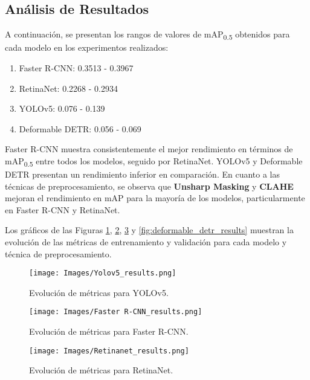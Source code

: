 \subsection{Análisis de Resultados}

A continuación, se presentan los rangos de valores de mAP\textsubscript{0.5} obtenidos para cada modelo en los experimentos realizados:

\begin{enumerate}
    \item Faster R-CNN: 0.3513 - 0.3967
    \item RetinaNet: 0.2268 - 0.2934
    \item YOLOv5: 0.076 - 0.139
    \item Deformable DETR: 0.056 - 0.069
\end{enumerate}

Faster R-CNN muestra consistentemente el mejor rendimiento en términos de mAP\textsubscript{0.5} entre todos los modelos, seguido por RetinaNet.
YOLOv5 y Deformable DETR presentan un rendimiento inferior en comparación.
En cuanto a las técnicas de preprocesamiento, se observa que \textbf{Unsharp Masking} y \textbf{CLAHE} mejoran el rendimiento en mAP para la mayoría de los modelos, particularmente en Faster R-CNN y RetinaNet.

Los gráficos de las Figuras \ref{fig:yolov5_results}, \ref{fig:faster_rcnn_results}, \ref{fig:retinanet_results} y \ref{fig:deformable_detr_results} muestran la evolución de las métricas de entrenamiento y validación para cada modelo y técnica de preprocesamiento.

\begin{figure}[htbp]
    \centering
    \texttt{[image: Images/Yolov5\_results.png]}
    \caption{Evolución de métricas para YOLOv5.}
    \label{fig:yolov5_results}
\end{figure}

\begin{figure}[htbp]
    \centering
    \texttt{[image: Images/Faster R-CNN\_results.png]}
    \caption{Evolución de métricas para Faster R-CNN.}
    \label{fig:faster_rcnn_results}
\end{figure}

\begin{figure}[htbp]
    \centering
    \texttt{[image: Images/Retinanet\_results.png]}
    \caption{Evolución de métricas para RetinaNet.}
    \label{fig:retinanet_results}
\end{figure}

